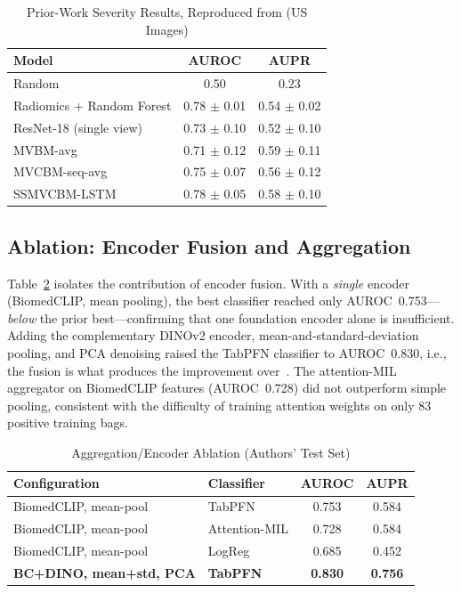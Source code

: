 \documentclass[journal]{IEEEtran}
\begin{document}
\begin{table}[!t]
\renewcommand{\arraystretch}{1.25}
\caption{Prior-Work Severity Results, Reproduced from \cite{marcinkevics2024interpretable} (US Images)}
\label{tab:prior}
\centering
\footnotesize
\begin{tabular}{lcc}
\toprule
Model & AUROC & AUPR \\
\midrule
Random                       & 0.50 & 0.23 \\
Radiomics + Random Forest    & 0.78 $\pm$ 0.01 & 0.54 $\pm$ 0.02 \\
ResNet-18 (single view)      & 0.73 $\pm$ 0.10 & 0.52 $\pm$ 0.10 \\
MVBM-avg                     & 0.71 $\pm$ 0.12 & 0.59 $\pm$ 0.11 \\
MVCBM-seq-avg                & 0.75 $\pm$ 0.07 & 0.56 $\pm$ 0.12 \\
SSMVCBM-LSTM                 & 0.78 $\pm$ 0.05 & 0.58 $\pm$ 0.10 \\
\bottomrule
\end{tabular}
\end{table}

\subsection{Ablation: Encoder Fusion and Aggregation}
Table~\ref{tab:ablation} isolates the contribution of encoder fusion. With a
\emph{single} encoder (BiomedCLIP, mean pooling), the best classifier reached only
AUROC~0.753---\emph{below} the prior best---confirming that one foundation encoder alone
is insufficient. Adding the complementary DINOv2 encoder, mean-and-standard-deviation
pooling, and PCA denoising raised the TabPFN classifier to AUROC~0.830, i.e., the fusion
is what produces the improvement over~\cite{marcinkevics2024interpretable}. The
attention-MIL aggregator on BiomedCLIP features (AUROC~0.728) did not outperform simple
pooling, consistent with the difficulty of training attention weights on only 83
positive training bags.

\begin{table}[!t]
\renewcommand{\arraystretch}{1.25}
\caption{Aggregation/Encoder Ablation (Authors' Test Set)}
\label{tab:ablation}
\centering
\footnotesize
\begin{tabular}{llcc}
\toprule
Configuration & Classifier & AUROC & AUPR \\
\midrule
BiomedCLIP, mean-pool & TabPFN        & 0.753 & 0.584 \\
BiomedCLIP, mean-pool & Attention-MIL & 0.728 & 0.584 \\
BiomedCLIP, mean-pool & LogReg        & 0.685 & 0.452 \\
\textbf{BC+DINO, mean+std, PCA} & \textbf{TabPFN} & \textbf{0.830} & \textbf{0.756} \\
\bottomrule
\end{tabular}
\end{table}
\end{document}

